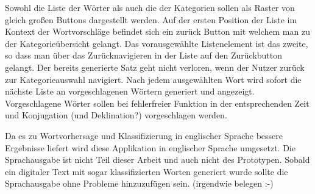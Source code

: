         Sowohl die Liste der Wörter als auch die der Kategorien sollen als Raster von gleich großen Buttons dargestellt werden. Auf der ersten Position der Liste im Kontext der Wortvorschläge befindet sich ein zurück Button mit welchem man zu der Kategorieübersicht gelangt. Das vorausgewählte Listenelement ist das zweite, so dass  man über das Zurücknavigieren in der Liste auf den Zurückbutton gelangt. Der bereits generierte Satz geht nicht verloren, wenn der Nutzer zurück zur Kategorieauswahl navigiert. Nach jedem ausgewählten Wort wird sofort die nächste Liste an vorgeschlagenen Wörtern generiert und angezeigt. Vorgeschlagene Wörter sollen bei fehlerfreier Funktion in der entsprechenden Zeit und Konjugation (und Deklination?) vorgeschlagen werden.
        
        Da es zu Wortvorhersage und Klassifizierung in englischer Sprache bessere Ergebnisse liefert wird diese Applikation in englischer Sprache umgesetzt. Die Sprachausgabe ist nicht Teil dieser Arbeit und auch nicht des Prototypen. Sobald ein digitaler Text mit sogar klassifizierten Worten generiert wurde sollte die Sprachausgabe ohne Probleme hinzuzufügen sein. (irgendwie belegen :-) 
        
	\newpage

    
    
    
    
    
    
    
    
    
    
    
    
    
    
    
    
    
    
    
    